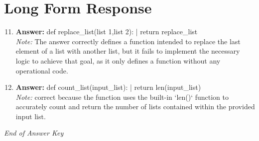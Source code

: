 \documentclass[12pt]{article}
\begin{document}
\section*{Long Form Response}
\begin{enumerate}[label=\arabic*.]
\setcounter{enumi}{10}
\item \textbf{Answer:} def replace\_list(list 1,list 2): | return replace\_list
\\ \textit{Note:} The answer correctly defines a function intended to replace the last element of a list with another list, but it fails to implement the necessary logic to achieve that goal, as it only defines a function without any operational code.
\item \textbf{Answer:} def count\_list(input\_list): | return len(input\_list)
\\ \textit{Note:} correct because the function uses the built-in `len()` function to accurately count and return the number of lists contained within the provided input list.
\end{enumerate}

\vfill
\noindent\textit{End of Answer Key}
\end{document}
